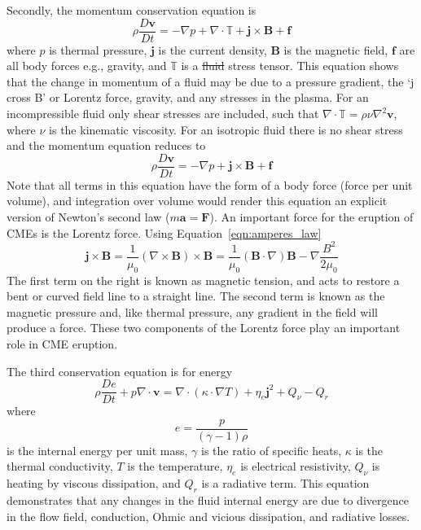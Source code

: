Secondly, the momentum conservation equation is
\begin{equation}
\rho\frac{D\mathbf{v}}{Dt}=-\nabla p + \nabla \cdot \mathbb{T} + \mathbf{j}\times \mathbf{B} + \mathbf{f}
\label{eqn:mhd_momentum1}
\end{equation}
where $p$ is thermal pressure, $\mathbf{j}$ is the current density, $\mathbf{B}$ is the magnetic field, $\mathbf{f}$ are all body forces e.g., gravity, and $\mathbb{T}$ is a \st{fluid} stress tensor. This equation shows that the change in momentum of a fluid may be due to a pressure gradient, the \textquoteleft j cross B' or Lorentz force, gravity, and any stresses in the plasma. For an incompressible fluid only shear stresses are included, such that $\nabla \cdot \mathbb{T}=\rho\nu\nabla^2\mathbf{v}$, where $\nu$ is the kinematic viscosity. For an isotropic fluid there is no shear stress and the momentum equation reduces to 
\begin{equation}
\rho\frac{D\mathbf{v}}{Dt}=-\nabla p + \mathbf{j}\times \mathbf{B} + \mathbf{f}
\label{eqn:mhd_momentum2}
\end{equation}
Note that all terms in this equation have the form of a body force (force per unit volume), and integration over volume would render this equation an explicit version of Newton's second law ($m\mathbf{a}=\mathbf{F}$). An important force for the eruption of CMEs is the Lorentz force. Using Equation~\ref{eqn:amperes_law}
\begin{equation}
\mathbf{j}\times \mathbf{B} = \frac{1}{\mu_0}(\nabla \times \mathbf{B})\times \mathbf{B} = \frac{1}{\mu_0}(\mathbf{B} \cdot \nabla)\mathbf{B} - \nabla \frac{B^2}{2\mu_0}
\end{equation}
The first term on the right is known as magnetic tension, and acts to restore a bent or curved field line to a straight line. The second term is known as the magnetic pressure and, like thermal pressure, any gradient in the field will produce a force. These two components of the Lorentz force play an important role in CME eruption.

The third conservation equation is for energy
\begin{equation}
\rho\frac{De}{Dt} + p\nabla\cdot \mathbf{v}=\nabla\cdot(\kappa\cdot\nabla T) +  \eta_e\mathbf{j}^2 + Q_{\nu} - Q_r
\end{equation}
where 
\begin{equation}
e = \frac{p}{(\gamma-1)\rho}
\end{equation}
is the internal energy per unit mass, $\gamma$ is the ratio of specific heats, $\kappa$ is the thermal conductivity, $T$ is the temperature, $\eta_e$ is electrical resistivity, $Q_{\nu}$ is heating by viscous dissipation, and $Q_r$ is a radiative term. This equation demonstrates that any changes in the fluid internal energy are due to divergence in the flow field, conduction, Ohmic and vicious dissipation, and radiative losses.

